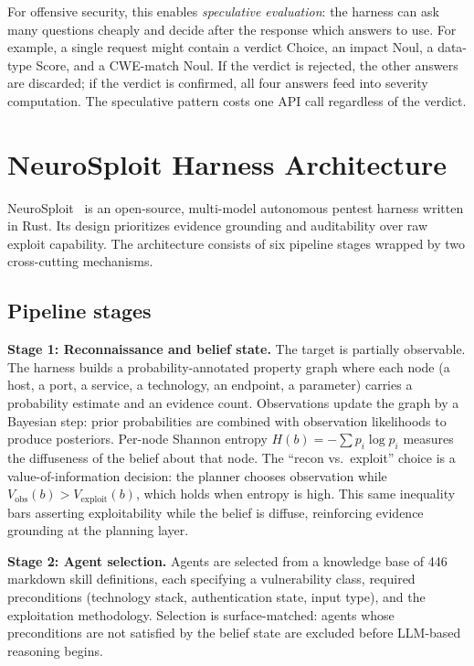 \documentclass[conference]{IEEEtran}
\begin{document}
For offensive security, this enables \emph{speculative evaluation}: the harness can ask many questions cheaply and decide after the response which answers to use. For example, a single request might contain a verdict Choice, an impact Noul, a data-type Score, and a CWE-match Noul. If the verdict is \textsf{rejected}, the other answers are discarded; if the verdict is \textsf{confirmed}, all four answers feed into severity computation. The speculative pattern costs one API call regardless of the verdict.

\section{NeuroSploit Harness Architecture}\label{sec:neurosploit}

NeuroSploit~\cite{neurosploit2026,santos2026assurance} is an open-source, multi-model autonomous pentest harness written in Rust. Its design prioritizes evidence grounding and auditability over raw exploit capability. The architecture consists of six pipeline stages wrapped by two cross-cutting mechanisms.

\subsection{Pipeline stages}

\textbf{Stage 1: Reconnaissance and belief state.} The target is partially observable. The harness builds a probability-annotated property graph where each node (a host, a port, a service, a technology, an endpoint, a parameter) carries a probability estimate and an evidence count. Observations update the graph by a Bayesian step: prior probabilities are combined with observation likelihoods to produce posteriors. Per-node Shannon entropy $H(b) = -\sum p_i \log p_i$ measures the diffuseness of the belief about that node. The ``recon vs.\ exploit'' choice is a value-of-information decision: the planner chooses observation while $V_{\text{obs}}(b) > V_{\text{exploit}}(b)$, which holds when entropy is high. This same inequality bars asserting exploitability while the belief is diffuse, reinforcing evidence grounding at the planning layer.

\textbf{Stage 2: Agent selection.} Agents are selected from a knowledge base of 446 markdown skill definitions, each specifying a vulnerability class, required preconditions (technology stack, authentication state, input type), and the exploitation methodology. Selection is surface-matched: agents whose preconditions are not satisfied by the belief state are excluded before LLM-based reasoning begins.
\end{document}
